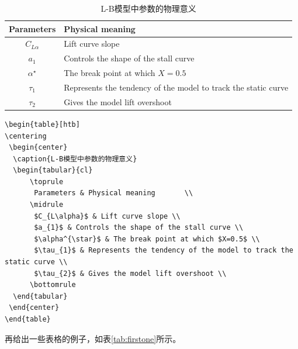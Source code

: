 \begin{table}[htb]               %
\centering
 \begin{center}
  \caption{L-B模型中参数的物理意义}
  \label{tab:LB-parameters}
  \begin{tabular}{cl}
      \toprule
       Parameters & Physical meaning       \\
      \midrule   %
       $C_{L\alpha}$ & Lift curve slope \\
       $a_{1}$ & Controls the shape of the stall curve \\
       $\alpha^{\star}$ & The break point at which $X=0.5$ \\
       $\tau_{1}$ & Represents the tendency of the model to track the static curve \\
       $\tau_{2}$ & Gives the model lift overshoot \\
      \bottomrule
  \end{tabular}
 \end{center}
\end{table}

\begin{lstlisting}[language={[LaTeX]TeX}, caption={插入表格}]
\begin{table}[htb]
\centering
 \begin{center}
  \caption{L-B模型中参数的物理意义}
  \begin{tabular}{cl}
      \toprule
       Parameters & Physical meaning       \\
      \midrule 
       $C_{L\alpha}$ & Lift curve slope \\
       $a_{1}$ & Controls the shape of the stall curve \\
       $\alpha^{\star}$ & The break point at which $X=0.5$ \\
       $\tau_{1}$ & Represents the tendency of the model to track the static curve \\
       $\tau_{2}$ & Gives the model lift overshoot \\
      \bottomrule
  \end{tabular}
 \end{center}
\end{table}
\end{lstlisting}

再给出一些表格的例子，如表\ref{tab:firstone}所示。

